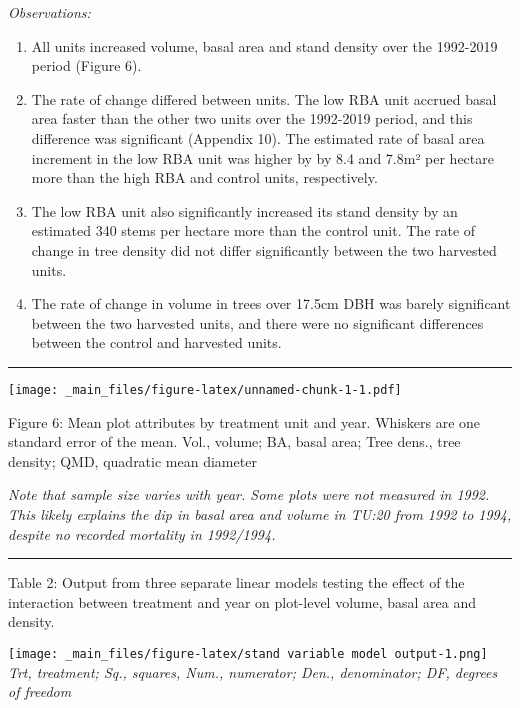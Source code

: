 \documentclass[
]{article}
\begin{document}
\emph{Observations:}

\begin{enumerate}
\def\labelenumi{\arabic{enumi}.}
\item
  All units increased volume, basal area and stand density over the 1992-2019 period (Figure 6).
\item
  The rate of change differed between units. The low RBA unit accrued basal area faster than the other two units over the 1992-2019 period, and this difference was significant (Appendix 10). The estimated rate of basal area increment in the low RBA unit was higher by by 8.4 and 7.8m² per hectare more than the high RBA and control units, respectively.
\item
  The low RBA unit also significantly increased its stand density by an estimated 340 stems per hectare more than the control unit. The rate of change in tree density did not differ significantly between the two harvested units.
\item
  The rate of change in volume in trees over 17.5cm DBH was barely significant between the two harvested units, and there were no significant differences between the control and harvested units.
\end{enumerate}

\begin{center}\rule{0.5\linewidth}{0.5pt}\end{center}

\texttt{[image: \_main\_files/figure-latex/unnamed-chunk-1-1.pdf]}

Figure 6: Mean plot attributes by treatment unit and year. Whiskers are one standard error of the mean. Vol., volume; BA, basal area; Tree dens., tree density; QMD, quadratic mean diameter

\emph{Note that sample size varies with year. Some plots were not measured in 1992. This likely explains the dip in basal area and volume in TU:20 from 1992 to 1994, despite no recorded mortality in 1992/1994.}

\begin{center}\rule{0.5\linewidth}{0.5pt}\end{center}

Table 2: Output from three separate linear models testing the effect of the interaction between treatment and year on plot-level volume, basal area and density.

\texttt{[image: \_main\_files/figure-latex/stand variable model output-1.png]}
\emph{Trt, treatment; Sq., squares, Num., numerator; Den., denominator; DF, degrees of freedom}
\end{document}
